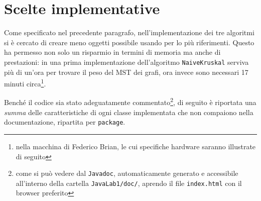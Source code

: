 \section{Scelte implementative}
Come specificato nel precedente paragrafo, nell'implementazione dei tre algoritmi si è cercato di creare meno oggetti possibile usando per lo più riferimenti. Questo ha permesso non solo un risparmio in termini di memoria ma anche di prestazioni: in una prima implementazione dell'algoritmo \texttt{NaiveKruskal} serviva più di un'ora per trovare il peso del MST dei grafi, ora invece sono necessari  17 minuti circa\footnote{nella macchina di Federico Brian, le cui specifiche hardware saranno illustrate di seguito}.\eqcapo

Benché il codice sia stato adeguatamente commentato\footnote{come si può vedere dal \texttt{Javadoc}, automaticamente generato e accessibile all'interno della cartella \texttt{JavaLab1/doc/}, aprendo il file \texttt{index.html} con il browser preferito}, di seguito è riportata una \emph{summa} delle caratteristiche di ogni classe implementata che non compaiono nella documentazione, ripartita per \texttt{package}.

